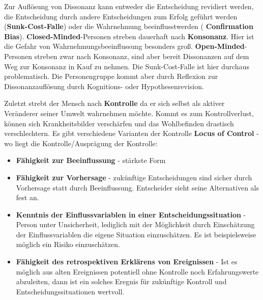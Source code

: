 Zur Auflösung von Dissonanz kann entweder die Entscheidung revidiert werden,
die Entscheidung durch andere Entscheidungen zum Erfolg geführt werden
(\textbf{Sunk-Cost-Falle}) oder die Wahrnehmung beeinflusstwerden
( \textbf{Confirmation Bias}).
\textbf{Closed-Minded}-Personen streben dauerhaft nach \textbf{Konsonanz}.
Hier ist die Gefahr von Wahrnehmungsbeeinflussung besonders groß.
\textbf{Open-Minded}-Personen streben zwar nach Konsonanz, sind aber bereit
Dissonanzen auf dem Weg zur Konsonanz in Kauf zu nehmen. Die Sunk-Cost-Falle
ist hier durchaus problematisch. Die Personengruppe kommt aber durch
Reflexion zur Dissonanzauflösung durch Kognitions- oder Hypothesenrevision.

Zuletzt strebt der Mensch nach \textbf{Kontrolle} da er sich selbst als aktiver Veränderer seiner
Umwelt wahrnehmen möchte. Kommt es zum Kontrollverlust, können sich
Krankheitsbilder verschärfen und das Wohlbefinden drastisch verschlechtern.
Es gibt verschiedene Varianten der Kontrolle \textbf{Locus of Control} -
wo liegt die Kontrolle/Ausprägung der Kontrolle:
\begin{itemize}
    \item \textbf{Fähigkeit zur Beeinflussung} - stärkste Form
    \item \textbf{Fähigkeit zur Vorhersage} - zukünftige Entscheidungen sind sicher durch
        Vorhersage statt durch Beeinflussung. Entscheider sieht seine Alternativen
        als fest an.
    \item \textbf{Kenntnis der Einflussvariablen in einer Entscheidungssituation}
        - Person unter Unsicherheit, lediglich mit der Möglichkeit durch
        Einschätzung der Einflussvariablen die eigene Situation einzuschätzen.
        Es ist beispielsweise möglich ein Risiko einzuschätzen.
    \item \textbf{Fähigkeit des retrospektiven Erklärens von Ereignissen} -
        Ist es möglich aus alten Ereignissen potentiell ohne Kontrolle noch
        Erfahrungswerte abzuleiten, dann ist ein solches Eregnis für
        zukünftige Kontroll und Entscheidungssituationen wertvoll.
\end{itemize}

